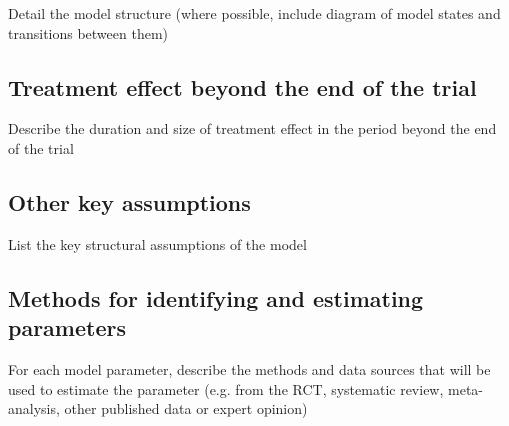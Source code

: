 Detail the model structure (where possible, include diagram of model states and transitions between them)



\subsection{Treatment effect beyond the end of the trial}

Describe the duration and size of treatment effect in the period
beyond the end of the trial


\subsection{Other key assumptions}

List the key structural assumptions of the model


\subsection{Methods for identifying and estimating parameters}

For each model parameter, describe the methods and data sources that
will be used to estimate the parameter (e.g. from the RCT, systematic
review, meta-analysis, other published data or expert opinion)


